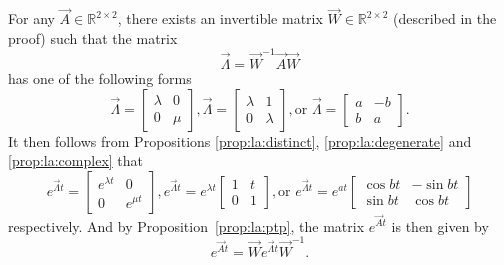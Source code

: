 \begin{corollary} %
	\label{cor:la:linear}
	For any $\vec A \in \mathbb R^{2 \times 2}$, there exists an invertible matrix $\vec W \in \mathbb R^{2 \times 2}$ (described in the proof) such that the matrix
	\begin{equation*}
		\vec \Lambda = \vec W^{-1} \vec A \vec W
	\end{equation*}
	has one of the following forms
	\begin{equation*}
		\vec \Lambda =
			\begin{bmatrix}
				\lambda & 0 \\
				0 		& \mu
			\end{bmatrix},
		\vec \Lambda = 
			\begin{bmatrix}
				\lambda & 1 \\
				0 		& \lambda
			\end{bmatrix}, \text{or }
		\vec \Lambda = 
			\begin{bmatrix}
				a 	& -b \\
				b 	& a
			\end{bmatrix}.
	\end{equation*}
	It then follows from Propositions \ref{prop:la:distinct}, \ref{prop:la:degenerate} and \ref{prop:la:complex} that
	\begin{equation*}
		e^{\vec \Lambda t} =
			\begin{bmatrix}
				e^{\lambda t}	& 0 \\
				0 				& e^{\mu t}
			\end{bmatrix},
		e^{\vec \Lambda t} = 
			e^{\lambda t}
			\begin{bmatrix}
				1 	& t \\
				0 	& 1
			\end{bmatrix}, \text{or }
		e^{\vec \Lambda t} =
			e^{at}
			\begin{bmatrix}
				\cos{bt}	& -\sin{bt} \\
				\sin{bt}	& \cos{bt}
			\end{bmatrix}
	\end{equation*}
	respectively. And by Proposition~\ref{prop:la:ptp}, the matrix $e^{\vec At}$ is then given by
	\begin{equation*}
		e^{\vec At} = \vec W e^{\vec \Lambda t} \vec W^{-1}.
	\end{equation*}
\end{corollary}

